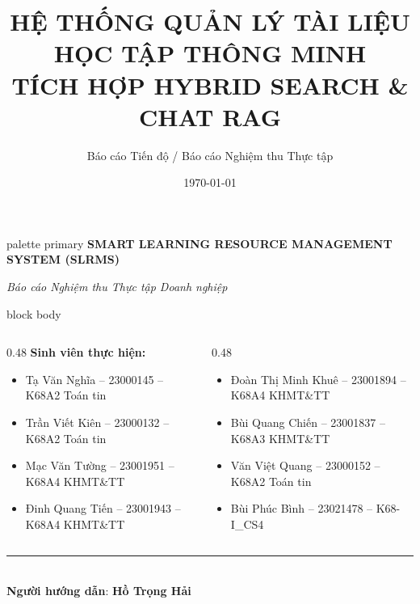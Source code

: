 \documentclass[10pt, aspectratio=169]{beamer}
\title[SLRMS - AI Search \& RAG System]{HỆ THỐNG QUẢN LÝ TÀI LIỆU HỌC TẬP THÔNG MINH\\ TÍCH HỢP HYBRID SEARCH \& CHAT RAG}
\subtitle{Báo cáo Tiến độ / Báo cáo Nghiệm thu Thực tập}
\date{\today}
\begin{document}
\begin{frame}[plain]
    \vfill
    \begin{center}
        \begin{beamercolorbox}[sep=8pt,center,rounded=true,shadow=true]{palette primary}
            {\large \textbf{SMART LEARNING RESOURCE MANAGEMENT SYSTEM (SLRMS)}}\\[0.1cm]
        \end{beamercolorbox}
        \vspace{0.15cm}
        {\footnotesize \textit{Báo cáo Nghiệm thu Thực tập Doanh nghiệp}}
    \end{center}

    \vspace{0.15cm}
    
    \begin{beamercolorbox}[sep=5pt,rounded=true]{block body}
        \footnotesize
        \begin{columns}[T]
            \begin{column}{0.48\textwidth}
                \textbf{\textcolor{primaryblue}{Sinh viên thực hiện:}}
                \begin{itemize}
                    \item Tạ Văn Nghĩa -- 23000145 -- K68A2 Toán tin
                    \item Trần Viết Kiên -- 23000132 -- K68A2 Toán tin
                    \item Mạc Văn Tường -- 23001951 -- K68A4 KHMT\&TT
                    \item Đinh Quang Tiến -- 23001943 -- K68A4 KHMT\&TT
                \end{itemize}
            \end{column}
            
            \begin{column}{0.48\textwidth}
                \textbf{\textcolor{primaryblue}{\phantom{Sinh viên thực hiện:}}}
                \begin{itemize}
                    \item Đoàn Thị Minh Khuê -- 23001894 -- K68A4 KHMT\&TT
                    \item Bùi Quang Chiến -- 23001837 -- K68A3 KHMT\&TT
                    \item Văn Việt Quang -- 23000152 -- K68A2 Toán tin
                    \item Bùi Phúc Bình -- 23021478 -- K68-I\_CS4
                \end{itemize}
            \end{column}
        \end{columns}
        
        \vspace{0.08cm}
        \centering
        \textcolor{primaryblue}{\rule{0.9\textwidth}{0.4pt}}\\[0.08cm]
        \textbf{Người hướng dẫn}: \textbf{Hồ Trọng Hải}
    \end{beamercolorbox}
    \vfill
\end{frame}
\end{document}

